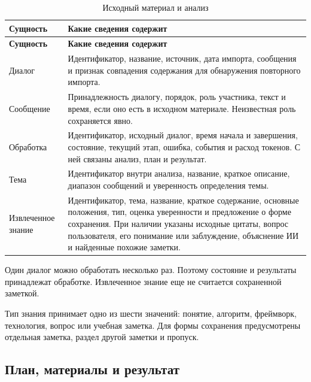 {\small\setlength{\tabcolsep}{5pt}\renewcommand{\arraystretch}{1.12}
\begin{longtable}{L{34mm}L{\dimexpr{}\tabcolsep-34mm\relax}}
\caption{Исходный материал и анализ}\\
\toprule
\textbf{Сущность} & \textbf{Какие сведения содержит} \\
\midrule\endfirsthead
\toprule
\textbf{Сущность} & \textbf{Какие сведения содержит} \\
\midrule\endhead
\bottomrule\endfoot
Диалог & Идентификатор, название, источник, дата импорта, сообщения и признак совпадения содержания для обнаружения повторного импорта. \\[6pt]
Сообщение & Принадлежность диалогу, порядок, роль участника, текст и время, если оно есть в исходном материале. Неизвестная роль сохраняется явно. \\[6pt]
Обработка & Идентификатор, исходный диалог, время начала и завершения, состояние, текущий этап, ошибка, события и расход токенов. С ней связаны анализ, план и результат. \\[6pt]
Тема & Идентификатор внутри анализа, название, краткое описание, диапазон сообщений и уверенность определения темы. \\[6pt]
Извлеченное знание & Идентификатор, тема, название, краткое содержание, основные положения, тип, оценка уверенности и предложение о форме сохранения. При наличии указаны исходные цитаты, вопрос пользователя, его понимание или заблуждение, объяснение ИИ и найденные похожие заметки. \\[6pt]
\end{longtable}}

Один диалог можно обработать несколько раз. Поэтому состояние и результаты принадлежат обработке. Извлеченное знание еще не считается сохраненной заметкой.


Тип знания принимает одно из шести значений: понятие, алгоритм, фреймворк, технология, вопрос или учебная заметка. Для формы сохранения предусмотрены отдельная заметка, раздел другой заметки и пропуск.


\clearpage
\subsection{План, материалы и результат}


